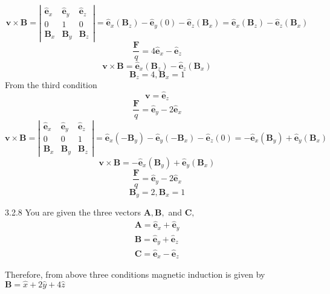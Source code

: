 \documentclass{article}
\begin{document}
\begin{flushleft}
$$
\mathbf{v} \times \mathbf{B}=\left|\begin{array}{ccc}
\hat{\mathbf{e}}_{x} & \hat{\mathbf{e}}_{y} & \hat{\mathbf{e}}_{z} \\
0 & 1 & 0 \\
\mathbf{B}_{x} & \mathbf{B}_{y} & \mathbf{B}_{z}
\end{array}\right|=\hat{\mathbf{e}}_{x}\left(\mathbf{B}_{z}\right)-\hat{\mathbf{e}}_{y}(0)-\hat{\mathbf{e}}_{z}\left(\mathbf{B}_{x}\right)=\hat{\mathbf{e}}_{x}\left(\mathbf{B}_{z}\right)-\hat{\mathbf{e}}_{z}\left(\mathbf{B}_{x}\right)
$$
$$\frac{\mathbf{F}}{q}=4 \hat{\mathbf{e}}_{x}-\hat{\mathbf{e}}_{z}$$
$$ \mathbf{v} \times \mathbf{B}=\hat{\mathbf{e}}_{x}\left(\mathbf{B}_{z}\right)-\hat{\mathbf{e}}_{z}\left(\mathbf{B}_{x}\right)$$
$$\mathbf{B}_{z}=4, \mathbf{B}_{x}=1$$
From the third condition 
$$
\mathbf{v}=\hat{\mathbf{e}}_{z}$$
$$ \frac{\mathbf{F}}{q}=\hat{\mathbf{e}}_{y}-2 \hat{\mathbf{e}}_{x}
$$
$$
\mathbf{v} \times \mathbf{B}=\left|\begin{array}{ccc}
\hat{\mathbf{e}}_{x} & \hat{\mathbf{e}}_{y} & \hat{\mathbf{e}}_{z} \\
0 & 0 & 1 \\
\mathbf{B}_{x} & \mathbf{B}_{y} & \mathbf{B}_{z}
\end{array}\right|=\hat{\mathbf{e}}_{x}\left(-\mathbf{B}_{y}\right)-\hat{\mathbf{e}}_{y}\left(-\mathbf{B}_{x}\right)-\hat{\mathbf{e}}_{z}(0)=-\hat{\mathbf{e}}_{x}\left(\mathbf{B}_{y}\right)+\hat{\mathbf{e}}_{y}\left(\mathbf{B}_{x}\right)
$$
$$\mathbf{v} \times \mathbf{B}=-\hat{\mathbf{e}}_{x}\left(\mathbf{B}_{y}\right)+\hat{\mathbf{e}}_{y}\left(\mathbf{B}_{x}\right)$$
$$ \frac{\mathbf{F}}{q}=\hat{\mathbf{e}}_{y}-2 \hat{\mathbf{e}}_{x}$$
$$\mathbf{B}_{y}=2, \mathbf{B}_{x}=1$$

\newpage


\begin{mybox}{3.2.8}
You are given the three vectors $\mathbf{A}, \mathbf{B},$ and $\mathbf{C},$
$$
\begin{array}{l}{\mathbf{A}=\hat{\mathbf{e}}_{x}+\hat{\mathbf{e}}_{y}} \\ {\mathbf{B}=\hat{\mathbf{e}}_{y}+\hat{\mathbf{e}}_{z}} \\ {\mathbf{C}=\hat{\mathbf{e}}_{x}-\hat{\mathbf{e}}_{z}}\end{array}
$$

Therefore, from above three conditions magnetic induction is given by $ \mathbf{B} = \hat { x } + 2 \hat { y } + 4 \hat { z }$
\end{mybox}



\end{flushleft}
\end{document}
